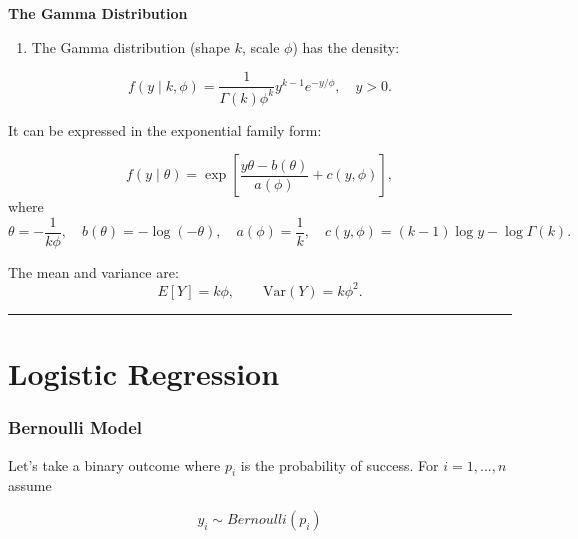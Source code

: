 \documentclass[
  letterpaper,
  DIV=11,
  numbers=noendperiod]{scrreprt}
\providecommand{\tightlist}{%
  \setlength{\itemsep}{0pt}\setlength{\parskip}{0pt}}\usepackage{longtable,booktabs,array}
\begin{document}
\begin{tcolorbox}[enhanced jigsaw, rightrule=.15mm, breakable, left=2mm, colframe=quarto-callout-tip-color-frame, opacityback=0, leftrule=.75mm, toprule=.15mm, colback=white, arc=.35mm, bottomrule=.15mm]

\textbf{The Gamma Distribution}\vspace{2mm}

\begin{enumerate}
\def\labelenumi{\arabic{enumi}.}
\setcounter{enumi}{2}
\tightlist
\item
  The Gamma distribution (shape \(k\), scale \(\phi\)) has the density:
\end{enumerate}

\[f(y \mid k, \phi) = \frac{1}{\Gamma(k) \phi^k} y^{k-1} e^{-y/\phi}, \quad y > 0. \]

It can be expressed in the exponential family form:

\[f(y \mid \theta) = \exp \left[ \frac{y \theta - b(\theta)}{a(\phi)} + c(y, \phi) \right], \]
where
\[ \theta = -\frac{1}{k\phi}, \quad b(\theta) = - \log (-\theta), \quad a(\phi) = \frac{1}{k}, \quad c(y, \phi) = (k-1)\log y - \log \Gamma(k). \]

The mean and variance are:
\[E[Y] = k \phi, \qquad \text{Var}(Y) = k \phi^2. \]

\end{tcolorbox}

\begin{center}\rule{0.5\linewidth}{0.5pt}\end{center}

\hypertarget{logistic-regression}{%
\section*{Logistic Regression}\label{logistic-regression}}


\hypertarget{bernoulli-model}{%
\subsubsection*{Bernoulli Model}\label{bernoulli-model}}

Let's take a binary outcome where \(p_i\) is the probability of success.
For \(i=1,...,n\) assume

\[ 
y_i \sim Bernoulli (p_i)
\]
\end{document}

